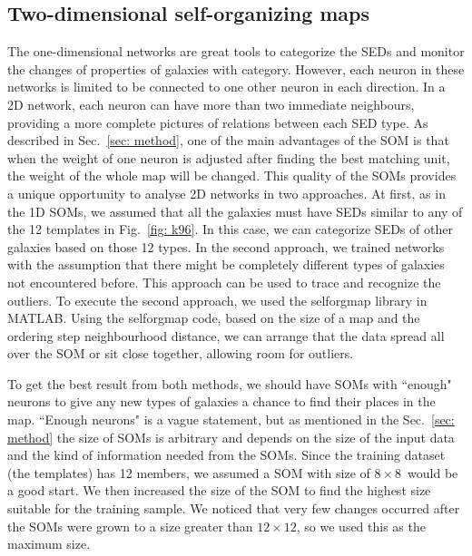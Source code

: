     \subsection{Two-dimensional self-organizing maps}
    \label{sec: 2D}
    The one-dimensional networks are great tools to categorize the SEDs and monitor the changes of properties of galaxies with category.
    However, each neuron in these networks is limited to be connected to one other neuron in each direction.
    In a 2D network, each neuron can have more than two immediate neighbours, providing a more complete pictures of relations between each SED type.
    As described in Sec.~\ref{sec: method}, one of the main advantages of the SOM is that when the weight of one neuron is adjusted after finding the best matching unit, the weight of the whole map will be changed.
    This quality of the SOMs provides a unique opportunity to analyse 2D networks in two approaches. 
    At first, as in the 1D SOMs, we assumed that all the galaxies must have SEDs similar to any of the 12 templates in Fig.~\ref{fig: k96}.
    In this case, we can categorize SEDs of other galaxies based on those 12 types.
   In the second approach, we trained networks with the assumption that there might be completely different types of galaxies not encountered before.
    This approach can be used to trace and recognize the outliers.
    To execute the second approach, we used the {\tiny selforgmap} library in {\tiny MATLAB}.
    Using the {\tiny selforgmap} code, based on the size of a map and the ordering step neighbourhood distance, we can arrange that the data spread all over the SOM or sit close together, allowing room for outliers.

    To get the best result from both methods, we should have SOMs with ``enough"  neurons to give any new types of galaxies a chance to find their places in the map.
    ``Enough  neurons" is a vague statement, but as mentioned in the Sec.~\ref{sec: method} the size of SOMs is arbitrary and depends on the size of the input data and the kind of information needed from the SOMs.
    Since the training dataset (the  templates) has 12 members, we assumed a SOM with size of $8\times8$~would be a good start.
    We then increased the size of the SOM to find the highest size suitable for the training sample.
    We noticed that very few changes occurred after the SOMs were grown to a size greater than $12\times12$, so we used this as the maximum size.
    
